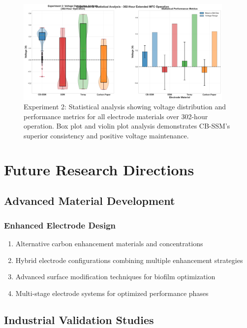 \documentclass[12pt,a4paper]{article}
\begin{document}
\begin{figure}[htbp]
\centering
\includegraphics[width=0.95\textwidth]{experiment_2_statistical_summary.pdf}
\caption{Experiment 2: Statistical analysis showing voltage distribution and performance metrics for all electrode materials over 302-hour operation. Box plot and violin plot analysis demonstrates CB-SSM's superior consistency and positive voltage maintenance.}
\label{fig:statistical_summary_exp2}
\end{figure}

\section{Future Research Directions}

\subsection{Advanced Material Development}

\subsubsection{Enhanced Electrode Design}

\begin{enumerate}
    \item Alternative carbon enhancement materials and concentrations
    \item Hybrid electrode configurations combining multiple enhancement strategies
    \item Advanced surface modification techniques for biofilm optimization
    \item Multi-stage electrode systems for optimized performance phases
\end{enumerate}

\subsection{Industrial Validation Studies}
\end{document}
